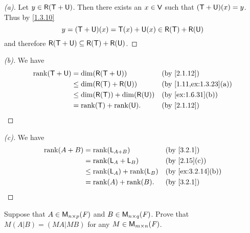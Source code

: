 \begin{proof}[(a)]
	Let \(y \in \rg{\T + \U}\).
	Then there exists an \(x \in \mathsf{V}\) such that \((\mathsf{T} + \mathsf{U})(x) = y\).
	Thus by \cref{1.3.10}
	\[
		y = (\T + \U)(x) = \T(x) + \U(x) \in \rg{\T} + \rg{\U}
	\]
	and therefore \(\rg{\T + \U} \subseteq \rg{\T} + \rg{\U}\).
\end{proof}

\begin{proof}[(b)]
	We have
	\begin{align*}
		\rk{\T + \U} & = \dim(\rg{\T + \U})               &  & \by{2.1.12}            \\
		             & \leq \dim(\rg{\T} + \rg{\U})       &  & \by{1.11,ex:1.3.23}[a] \\
		             & \leq \dim(\rg{\T}) + \dim(\rg{\U}) &  & \by{ex:1.6.31}[b]      \\
		             & = \rk{\T} + \rk{\U}.               &  & \by{2.1.12}
	\end{align*}
\end{proof}

\begin{proof}[(c)]
	We have
	\begin{align*}
		\rk{A + B} & = \rk{\L_{A + B}}          &  & \by{3.2.1}        \\
		           & = \rk{\L_A + \L_B}         &  & \by{2.15}[c]      \\
		           & \leq \rk{\L_A} + \rk{\L_B} &  & \by{ex:3.2.14}[b] \\
		           & = \rk{A} + \rk{B}.         &  & \by{3.2.1}
	\end{align*}
\end{proof}

\begin{ex}\label{ex:3.2.15}
	Suppose that \(A \in \ms[n][p][\F]\) and \(B \in \ms[n][q][\F]\).
	Prove that \(M (A | B) = (MA | MB)\) for any \(M \in \MS\).
\end{ex}

